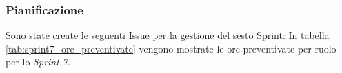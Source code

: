 \subsubsection{Pianificazione}
\label{sec:sprint7_pianificazione}
Sono state create le seguenti Issue per la gestione del sesto Sprint: 
\hyperref[tab:sprint7_ore_preventivate]{In tabella \ref{tab:sprint7_ore_preventivate}} vengono mostrate le ore preventivate per ruolo per lo \textit{Sprint 7}.

\begin{table}[H]
    \centering
    \caption{Ore preventivate per ruolo Sprint 7}
    \label{tab:sprint7_ore_preventivate}
\end{table}